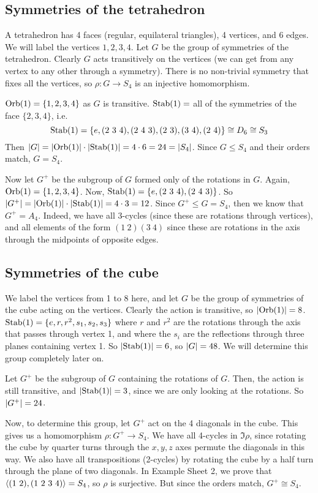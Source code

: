 \subsection{Symmetries of the tetrahedron}
A tetrahedron has 4 faces (regular, equilateral triangles), 4 vertices, and 6 edges.
We will label the vertices \(1, 2, 3, 4\).
Let \(G\) be the group of symmetries of the tetrahedron.
Clearly \(G\) acts transitively on the vertices (we can get from any vertex to any other through a symmetry).
There is no non-trivial symmetry that fixes all the vertices, so \(\rho\colon G \to S_4\) is an injective homomorphism.

\(\operatorname{Orb}(1) = \{ 1, 2, 3, 4 \}\) as \(G\) is transitive.
\(\operatorname{Stab}(1) =\) all of the symmetries of the face \(\{2,3,4\}\), i.e.
\[
	\operatorname{Stab}(1) = \{ e, (2\ 3\ 4), (2\ 4\ 3), (2\ 3), (3\ 4), (2\ 4) \} \cong D_6 \cong S_3
\]
Then \(\abs{G} = \abs{\operatorname{Orb}(1)} \cdot \abs{\operatorname{Stab}(1)} = 4 \cdot 6 = 24 = \abs{S_4}\).
Since \(G \leq S_4\) and their orders match, \(G = S_4\).

Now let \(G^+\) be the subgroup of \(G\) formed only of the rotations in \(G\).
Again, \(\operatorname{Orb}(1) = \{ 1, 2, 3, 4 \}\).
Now, \(\operatorname{Stab}(1) = \{ e, (2\ 3\ 4), (2\ 4\ 3) \}\).
So \(\abs{G^+} = \abs{\operatorname{Orb}(1)} \cdot \abs{\operatorname{Stab}(1)} = 4 \cdot 3 = 12\).
Since \(G^+ \leq G = S_4\), then we know that \(G^+ = A_4\).
Indeed, we have all 3-cycles (since these are rotations through vertices), and all elements of the form \((1\ 2)(3\ 4)\) since these are rotations in the axis through the midpoints of opposite edges.

\subsection{Symmetries of the cube}
We label the vertices from 1 to 8 here, and let \(G\) be the group of symmetries of the cube acting on the vertices.
Clearly the action is transitive, so \(\abs{\operatorname{Orb}(1)} = 8\).
\(\operatorname{Stab}(1) = \{ e, r, r^2, s_1, s_2, s_3 \}\) where \(r\) and \(r^2\) are the rotations through the axis that passes through vertex 1, and where the \(s_i\) are the reflections through three planes containing vertex 1.
So \(\abs{\operatorname{Stab}(1)} = 6\), so \(\abs{G} = 48\).
We will determine this group completely later on.

Let \(G^+\) be the subgroup of \(G\) containing the rotations of \(G\).
Then, the action is still transitive, and \(\abs{\operatorname{Stab}(1)} = 3\), since we are only looking at the rotations.
So \(\abs{G^+} = 24\).

Now, to determine this group, let \(G^+\) act on the 4 diagonals in the cube.
This gives us a homomorphism \(\rho\colon G^+ \to S_4\).
We have all 4-cycles in \(\Im \rho\), since rotating the cube by quarter turns through the \(x, y, z\) axes permute the diagonals in this way.
We also have all transpositions (2-cycles) by rotating the cube by a half turn through the plane of two diagonals.
In Example Sheet 2, we prove that \(\langle{} (1\ 2), (1\ 2\ 3\ 4) \rangle = S_4\), so \(\rho\) is surjective.
But since the orders match, \(G^+ \cong S_4\).

